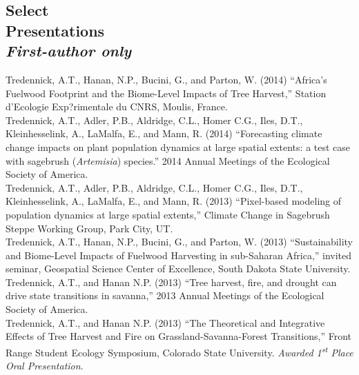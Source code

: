 \documentclass[margin,line]{resume}
\begin{document}
\begin{resume}
    \section{\mysidestyle Select\\Presentations\\ \textsl{\footnotesize First-author only}}
    Tredennick, A.T., Hanan, N.P., Bucini, G., and Parton, W. (2014) ``Africa's Fuelwood Footprint and the Biome-Level Impacts of Tree Harvest,'' Station d'Ecologie Exp?rimentale du CNRS, Moulis, France. \vspace{-6mm}\\%
    
    Tredennick, A.T., Adler, P.B., Aldridge, C.L., Homer C.G., Iles, D.T., Kleinhesselink, A., LaMalfa, E., and Mann, R. (2014) ``Forecasting climate change impacts on plant population dynamics at large spatial extents: a test case with sagebrush (\emph{Artemisia}) species.'' 2014 Annual Meetings of the Ecological Society of America.\vspace{-6mm}\\%
    
    Tredennick, A.T., Adler, P.B., Aldridge, C.L., Homer C.G., Iles, D.T., Kleinhesselink, A., LaMalfa, E., and Mann, R. (2013) ``Pixel-based modeling of population dynamics at large spatial extents,'' Climate Change in Sagebrush Steppe Working Group, Park City, UT. \vspace{-6mm}\\%
    
    Tredennick, A.T., Hanan, N.P., Bucini, G., and Parton, W. (2013) ``Sustainability and Biome-Level Impacts of Fuelwood Harvesting in sub-Saharan Africa,'' invited seminar, Geospatial Science Center of Excellence, South Dakota State University. \vspace{-6mm}\\%
    
    Tredennick, A.T., and Hanan N.P. (2013) ``Tree harvest, fire, and drought can drive state transitions in savanna,'' 2013 Annual Meetings of the Ecological Society of America. \vspace{-6mm}\\%
    
    Tredennick, A.T., and Hanan N.P. (2013) ``The Theoretical and Integrative Effects of Tree Harvest and Fire on Grassland-Savanna-Forest Transitions,'' Front Range Student Ecology Symposium, Colorado State University. \textsl{Awarded 1\textsuperscript{st} Place Oral Presentation}. \vspace{-6mm}\\%
    

\end{resume}
\end{document}
